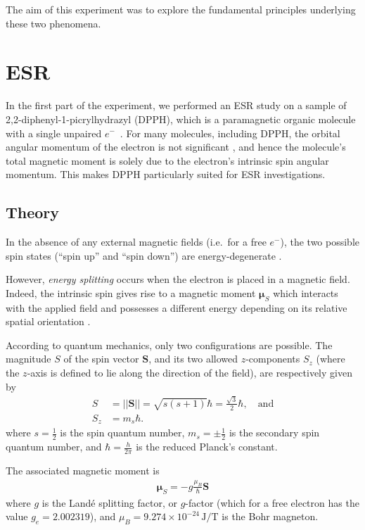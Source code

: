 \documentclass[a4paper]{jpconf}
\numberwithin{equation}{section}
\begin{document}
The aim of this experiment was to explore the fundamental principles underlying these two phenomena.

\section{ESR}
In the first part of the experiment, we performed an ESR study on a sample of 2,2-diphenyl-1-picrylhydrazyl (DPPH), which is a paramagnetic organic molecule with a single unpaired $e^-$~\cite{MacLaren}. For many molecules, including DPPH, the orbital angular momentum of the electron is not significant \cite{MacLaren},
and hence the molecule\textquoteright s total magnetic moment is solely due to the electron\textquoteright s intrinsic spin angular momentum. This makes DPPH particularly suited for ESR investigations.
 
\subsection{Theory}\label{section: theory}
In the absence of any external magnetic fields (i.e.\ for a free $e^-$), the two possible spin states (``spin up'' and ``spin down'') are energy-degenerate \cite{Yadav}.

However, \emph{energy splitting} occurs when the electron is placed in a magnetic field. Indeed, the intrinsic spin gives rise to a magnetic moment $\bm{\mu}_S$ which interacts with the applied field and possesses a different energy depending on its relative spatial orientation \cite{Yadav}. 

According to quantum mechanics, only two configurations are possible. The magnitude $S$ of the spin vector $\mathbf{S}$, and its two allowed $z$-components $S_z$ (where the $z$-axis is defined to lie along the direction of the field), are respectively given by
\begin{align}
	S &= \lvert\lvert\mathbf{S}\rvert\rvert = \sqrt{s(s+1)}\hbar = \tfrac{\sqrt{3}}{2}\hbar,  \quad \text{and} \nonumber \\
	S_z &= m_s \hbar. \label{eqn: magnetic moment z-projection}
\end{align}
where $s=\tfrac12$ is the spin quantum number, $m_s=\pm\tfrac12$ is the secondary spin quantum number, and $\hbar = \tfrac{h}{2 \pi}$ is the reduced Planck\textquoteright s constant.

The associated magnetic moment is
\begin{align}
	\bm{\mu}_S = - g \frac{\mu_B}{\hbar} \mathbf{S} \label{eqn: magnetic moment}
\end{align}
where $g$ is the Land\'e splitting factor, or $g$-factor (which for a free electron has the value $g_e = 2.002319$), and $\mu_B = 9.274 \times 10^{-24} \, \si{\joule\per\tesla}$ is the Bohr magneton. 
\end{document}
